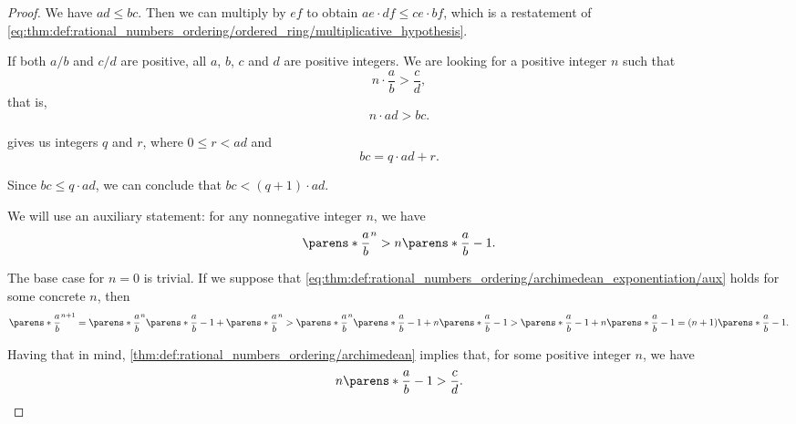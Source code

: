 \begin{proof}
  We have \( ad \leq bc \). Then we can multiply by \( ef \) to obtain \( ae \cdot df \leq ce \cdot bf \), which is a restatement of \eqref{eq:thm:def:rational_numbers_ordering/ordered_ring/multiplicative_hypothesis}.

   If both \( a / b \) and \( c / d \) are positive, all \( a \), \( b \), \( c \) and \( d \) are positive integers. We are looking for a positive integer \( n \) such that
  \begin{equation*}
    n \cdot \frac a b > \frac c d,
  \end{equation*}
  that is,
  \begin{equation*}
    n \cdot ad > bc.
  \end{equation*}

   gives us integers \( q \) and \( r \), where \( 0 \leq r < ad \) and
  \begin{equation*}
    bc = q \cdot ad + r.
  \end{equation*}

  Since \( bc \leq q \cdot ad \), we can conclude that \( bc < (q + 1) \cdot ad \).

   We will use an auxiliary statement: for any nonnegative integer \( n \), we have
  \begin{equation}\label{eq:thm:def:rational_numbers_ordering/archimedean_exponentiation/aux}
    \parens*{ \frac a b }^n > n\parens*{ \frac a b - 1 }.
  \end{equation}

  The base case for \( n = 0 \) is trivial. If we suppose that \eqref{eq:thm:def:rational_numbers_ordering/archimedean_exponentiation/aux} holds for some concrete \( n \), then
  \small
  \begin{equation*}
    \parens*{ \frac a b }^{n+1} = \parens*{ \frac a b }^n\parens*{ \frac a b - 1 } + \parens*{ \frac a b }^n > \parens*{ \frac a b }^n\parens*{ \frac a b - 1 } + n\parens*{ \frac a b - 1 } > \parens*{ \frac a b - 1 } + n\parens*{ \frac a b - 1 } = (n + 1)\parens*{ \frac a b - 1 }.
  \end{equation*}
  \normalsize

  Having that in mind, \cref{thm:def:rational_numbers_ordering/archimedean} implies that, for some positive integer \( n \), we have
  \begin{equation*}
    n\parens*{\frac a b - 1} > \frac c d.
  \end{equation*}


\end{proof}
